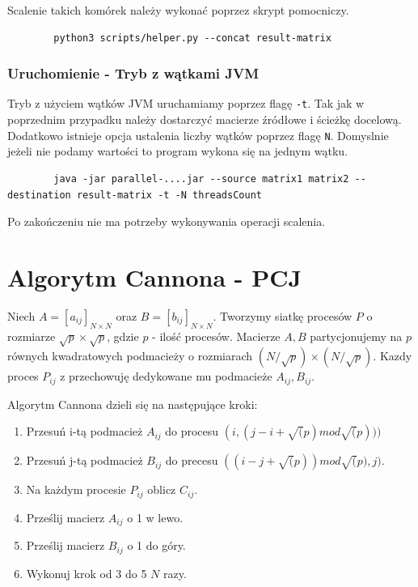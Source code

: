 \documentclass[11pt]{article}
\begin{document}
    Scalenie takich komórek należy wykonać poprzez skrypt pomocniczy.

    \begin{lstlisting}
        python3 scripts/helper.py --concat result-matrix
    \end{lstlisting}

    \subsubsection{Uruchomienie - Tryb z wątkami JVM}

    Tryb z użyciem wątków JVM uruchamiamy poprzez flagę \verb|-t|. Tak jak w poprzednim przypadku należy dostarczyć macierze źródłowe i ścieżkę docelową.
    Dodatkowo istnieje opcja ustalenia liczby wątków poprzez flagę \verb|N|. Domyslnie jeżeli nie podamy wartości to program wykona się na jednym wątku.
    \begin{lstlisting}
        java -jar parallel-....jar --source matrix1 matrix2 --destination result-matrix -t -N threadsCount
    \end{lstlisting}

    Po zakończeniu nie ma potrzeby wykonywania operacji scalenia.
    
    \section{Algorytm Cannona - PCJ}

    Niech $A = [a_{ij}]_{N\times N}$ oraz $B = [b_{ij}]_{N\times N}$. Tworzymy siatkę procesów $P$ o rozmiarze $\sqrt{p}\times\sqrt{p}$, gdzie $p$ - ilość procesów.
    Macierze $A, B$ partycjonujemy na $p$ równych kwadratowych podmacieży o rozmiarach $(N/\sqrt{p})\times (N/\sqrt{p})$.
    Kazdy proces $P_{ij}$ z przechowuję dedykowane mu podmacieże $A_{ij}, B_{ij}$.

    Algorytm Cannona dzieli się na następujące kroki:
    \begin{enumerate}
        \item Przesuń i-tą podmacież $A_{ij}$ do procesu $(i, (j-i+\sqrt(p) mod \sqrt(p)))$
        \item Przesuń j-tą podmacież $B_{ij}$ do precesu $((i-j+\sqrt(p)) mod \sqrt(p), j)$.
        \item Na każdym procesie $P_{ij}$ oblicz $C_{ij}$.
        \item Prześlij macierz $A_{ij}$ o 1 w lewo.
        \item Prześlij macierz $B_{ij}$ o 1 do góry.
        \item Wykonuj krok od 3 do 5 $N$ razy.
    \end{enumerate}
\end{document}
